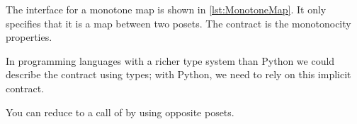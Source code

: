 
The interface for a monotone map is shown in \cref{lst:MonotoneMap}.
It only specifies that it is a map between two posets.
The contract is the monotonocity properties.

In programming languages with a richer type system than Python we could describe the contract using types; with Python, we need to rely on this implicit contract.


\begin{widepar}
\end{widepar}

\begin{hint}
    You can reduce  to a call of  by using opposite posets.
\end{hint}
